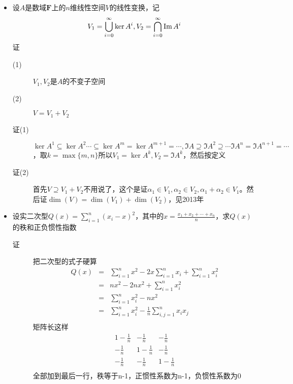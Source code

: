 \begin{itemize}
\item 设$A$是数域$\mathbf{F}$上的$n$维线性空间$V$的线性变换，记
\[
V_1=\bigcup_{i=0}^{\infty} \ker A^i,V_2=\bigcap_{i=0}^{\infty} \operatorname{Im} A^i
\]
证
\begin{description}
\item[(1)] $V_1,V_2$是$A$的不变子空间
\item[(2)] $V=V_1+V_2$
\item[证(1)] $\ker A^1 \subseteq \ker A^2 \cdots \subseteq \ker A^m = \ker A^{m+1} =\cdots,\Im A \supseteq \Im A^2 \supseteq \cdots \Im A^n = \Im A^{n+1} =\cdots$，取$k=\max\{m,n\}$所以$V_1=\ker A^{k},V_2=\Im A^{k}$，然后按定义
\item[证(2)] 首先$V\supseteq V_1+V_2$不用说了，这个是证$\alpha_1\in V_1,\alpha_2\in V_2,\alpha_1 + \alpha_2\in V_1$。然后证$\dim(V)=\dim(V_1)+\dim(V_2)$，见2013年
\end{description}

\item 设实二次型$Q(x)=\sum_{i=1}^n(x_i-x)^2$，其中的$x=\frac{x_1+x_2+\cdots+x_n}{n}$，求$Q(x)$的秩和正负惯性指数
\begin{description}
\item[证] 把二次型的式子硬算
\begin{eqnarray*}
Q(x)&=&\sum_{i=1}^n x^2-2x\sum_{i=1}^n x_i+\sum_{i=1}^n x_i^2\\
&=& n x^2-2nx^2+\sum_{i=1}^n x_i^2\\
&=& \sum_{i=1}^n x_i^2 - nx^2 \\
&=& \sum_{i=1}^n x_i^2 - \frac{1}{n}\sum_{i,j=1}^n x_ix_j \\
\end{eqnarray*}
矩阵长这样
\[
\begin{array}{ccc}
1-\frac{1}{n} & -\frac{1}{n} & -\frac{1}{n}\\
-\frac{1}{n} & 1-\frac{1}{n} & -\frac{1}{n}\\
-\frac{1}{n} &-\frac{1}{n} & 1-\frac{1}{n}\\
\end{array}
\]
全部加到最后一行，秩等于n-1，正惯性系数为n-1，负惯性系数为0
\end{description}



\end{itemize}
